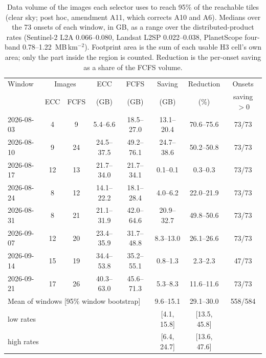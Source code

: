 \begin{table}[H]
\centering
\footnotesize
\renewcommand{\arraystretch}{1.2}
\setlength{\tabcolsep}{4pt}
\caption{Data volume of the images each selector uses to reach 95\% of the reachable tiles (clear sky; post hoc, amendment A11, which corrects A10 and A6). Medians over the 73 onsets of each window, in GB, as a range over the distributed-product rates (Sentinel-2 L2A 0.066--0.080, Landsat L2SP 0.022--0.038, PlanetScope four-band 0.78--1.22~MB\,km$^{-2}$). Footprint area is the sum of each usable H3 cell's own area; only the part inside the region is counted. Reduction is the per-onset saving as a share of the FCFS volume.}
\label{tab:a11_volume}
\begin{tabular}{|l|c|c|c|c|c|c|c|}
\hline
Window & \multicolumn{2}{c|}{Images} & ECC & FCFS & Saving & Reduction & Onsets \\
 & ECC & FCFS & (GB) & (GB) & (GB) & (\%) & saving $>0$ \\
\hline
2026-08-03 & 4 & 9 & 5.4--6.6 & 18.5--27.0 & 13.1--20.4 & 70.6--75.6 & 73/73 \\
\hline
2026-08-10 & 9 & 24 & 24.5--37.5 & 49.2--76.1 & 24.7--38.6 & 50.2--50.8 & 73/73 \\
\hline
2026-08-17 & 12 & 13 & 21.7--34.0 & 21.7--34.1 & 0.1--0.1 & 0.3--0.3 & 73/73 \\
\hline
2026-08-24 & 8 & 12 & 14.1--22.2 & 18.1--28.4 & 4.0--6.2 & 22.0--21.9 & 73/73 \\
\hline
2026-08-31 & 8 & 21 & 21.1--31.9 & 42.0--64.6 & 20.9--32.7 & 49.8--50.6 & 73/73 \\
\hline
2026-09-07 & 12 & 20 & 23.4--35.9 & 31.7--48.8 & 8.3--13.0 & 26.1--26.6 & 73/73 \\
\hline
2026-09-14 & 15 & 19 & 34.4--53.8 & 35.2--55.1 & 0.8--1.3 & 2.3--2.3 & 47/73 \\
\hline
2026-09-21 & 17 & 26 & 40.3--63.0 & 45.6--71.3 & 5.3--8.3 & 11.6--11.6 & 73/73 \\
\hline
\multicolumn{5}{|l|}{Mean of windows [95\% window bootstrap]} & 9.6--15.1 & 29.1--30.0 & 558/584 \\
\hline
\multicolumn{5}{|l|}{\quad low rates} & [4.1, 15.8] & [13.5, 45.8] & \\
\hline
\multicolumn{5}{|l|}{\quad high rates} & [6.4, 24.7] & [13.6, 47.6] & \\
\hline
\end{tabular}
\end{table}
